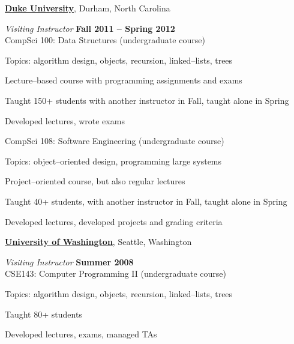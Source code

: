 \documentclass[10pt]{article}
\newenvironment{outerlist}[1][\enskip\textbullet]%
        {\begin{itemize}[#1]}{\end{itemize}%
         \vspace{-.6\baselineskip}}
\newenvironment{innerlist}[1][\enskip\textbullet]%
        {\begin{compactitem}[#1]}{\end{compactitem}}
\newcommand{\blankline}{\quad\pagebreak[2]}
\begin{document}
\blankline

\href{http://www.duke.edu}{\textbf{Duke University}},
Durham, North Carolina
\begin{outerlist}
\item[] \textit{Visiting Instructor}%
    \hfill \textbf{Fall 2011 -- Spring 2012}\\
    CompSci 100: Data Structures (undergraduate course)
    \begin{innerlist}
    \item Topics: algorithm design, objects, recursion, linked--lists, trees
    \item Lecture--based course with programming assignments and exams
    \item Taught 150+ students with another instructor in Fall, taught alone in Spring
    \item Developed lectures, wrote exams
    \end{innerlist}

    CompSci 108: Software Engineering (undergraduate course)
    \begin{innerlist}
    \item Topics: object--oriented design, programming large systems
    \item Project--oriented course, but also regular lectures
    \item Taught 40+ students, with another instructor in Fall, taught alone in Spring
    \item Developed lectures, developed projects and grading criteria
    \end{innerlist}

\end{outerlist}

\blankline

\href{http://www.uw.edu}{\textbf{University of Washington}},
Seattle, Washington
\begin{outerlist}
\item[] \textit{Visiting Instructor}%
    \hfill \textbf{Summer 2008}\\
    CSE143: Computer Programming II (undergraduate course)
    \begin{innerlist}
    \item Topics: algorithm design, objects, recursion, linked--lists, trees
    \item Taught 80+ students
    \item Developed lectures, exams, managed TAs
    \end{innerlist}
\end{outerlist}
\end{document}

